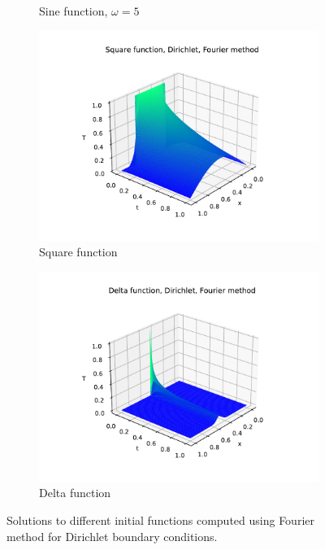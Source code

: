 \documentclass[12pt, a4paper]{article}
\begin{document}
\begin{figure}[hbtp]
\begin{subfigure}{0.5\textwidth}
  \caption{Sine function, $\omega = 5$} \label{fig:b}
  \end{subfigure}
  \medskip
  \begin{subfigure}{0.5\textwidth}
  \includegraphics[width=\linewidth]{graphs/3_dodatna/square.pdf}
  \caption{Square function} \label{fig:c}
  \end{subfigure}
  \hspace*{\fill}
  \begin{subfigure}{0.5\textwidth}
  \includegraphics[width=\linewidth]{graphs/3_dodatna/delta.pdf}
  \caption{Delta function} \label{fig:d}
  \end{subfigure} 
  \caption{Solutions to different initial functions computed using Fourier method for Dirichlet boundary conditions.} \label{fig:1}
\end{figure}
\end{document}
